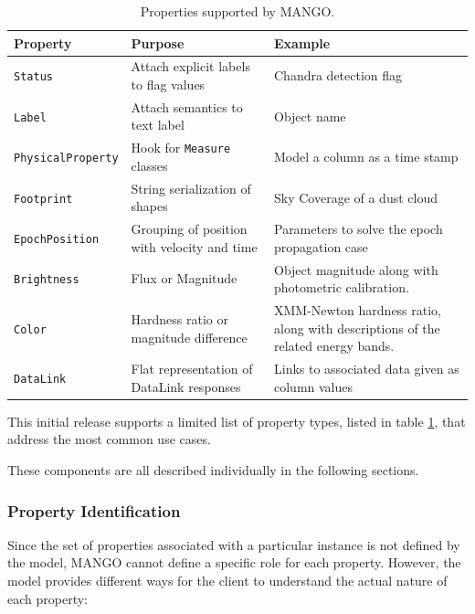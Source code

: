 \documentclass[11pt,a4paper]{ivoa}
\begin{document}
\begin{table}[h!]
\small
\begin{center}
\begin{tabular}{|| p{3.5cm} | p{3.5cm} |  p{3.5cm} ||} 
 \hline\hline
 \textbf{Property} & \textbf{Purpose} & \textbf{Example} \\ 
  \hline\hline
 \texttt{Status} & Attach explicit labels to flag values & Chandra detection flag  \\ 
 \hline
 \texttt{Label} & Attach semantics to text label & Object name \\
 \hline
 \texttt{PhysicalProperty} & Hook for \texttt{Measure} classes & Model a column as a time stamp \\
 \hline
 \texttt{Footprint} & String serialization of shapes & Sky Coverage of a dust cloud \\
 \hline
 \texttt{EpochPosition} & Grouping of position with velocity and time & Parameters to solve the epoch propagation case\\  
 \hline
 \texttt{Brightness} & Flux or Magnitude & Object magnitude along with photometric calibration.  \\ 
 \hline
 \texttt{Color} & Hardness ratio or magnitude difference & XMM-Newton hardness ratio, along with descriptions of the related energy bands. \\ [1ex] 
 \hline
 \texttt{DataLink} & Flat representation of DataLink responses & Links to associated data given as column values\\ [1ex] 
 \hline
\end{tabular}
\caption{Properties supported by MANGO.}
\label{table:properties}
\end{center}
 \end{table}
This initial release supports a limited list of property types, listed in table \ref{table:properties},
that address the most common use cases.

These components are all described individually in the following sections.

\subsubsection{Property Identification}
Since the set of properties associated with a particular instance is not defined by the model,
MANGO cannot define a specific role for each property. However, the model provides different ways
for the client to understand the actual nature of each property:
\end{document}
